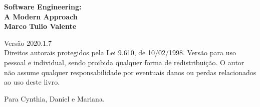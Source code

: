 \thispagestyle{empty}



\newpage
\thispagestyle{empty}
\vspace*{4cm}
\begin{center}
{\Huge \bf  Software Engineering:}\\ 
\vspace*{1cm}
{\Huge \bf  A Modern Approach}\\ 
\vspace*{3cm}
{\Large \bf Marco Tulio Valente}
\end{center}
\newpage

\newpage
\thispagestyle{empty}
\vspace*{3cm}
\begin{center}
{\Large  Versão 2020.1.7}\\ 
\vspace*{1cm}
{Direitos autorais protegidos pela Lei 9.610, de 10/02/1998. Versão para  uso pessoal e individual, sendo proibida qualquer forma de redistribuição. O autor não assume qualquer responsabilidade por eventuais danos ou perdas relacionados ao uso deste livro.}
\end{center}

\vspace*{3cm}


%

\newpage
\newpage

\thispagestyle{empty}
\vspace*{5cm}
\begin{center}
\large Para Cynthia, Daniel e Mariana.
\end{center}

\newpage
\newpage

\tableofcontents
